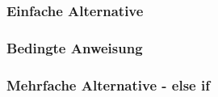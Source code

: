 		\begin{minipage}[t]{5.5 cm}
			\subsubsection{Einfache Alternative}
				
		\end{minipage}
		\begin{minipage}[t]{5.5 cm}
			\subsubsection{Bedingte Anweisung}
				
		\end{minipage}
		\begin{minipage}[t]{7 cm}
			\subsubsection{Mehrfache Alternative - else if}
				
		\end{minipage}